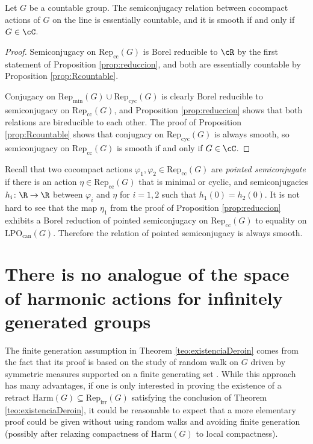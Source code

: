 \documentclass[reqno]{amsart}
\begin{document}
\begin{cor}
	Let $G$ be a countable group. The semiconjugacy relation between cocompact actions of $G$ on the line is essentially countable, and it is smooth if and only if $G \in \cC$.
\end{cor}
\begin{proof}
Semiconjugacy on $\mathrm{Rep}_\mathrm{cc}(G)$ is Borel reducible to $\cR$ by the first statement of Proposition \ref{prop:reduccion}, and both are essentially countable by Proposition \ref{prop:Rcountable}.

Conjugacy on $\mathrm{Rep}_\mathrm{min}(G) \cup \mathrm{Rep}_\mathrm{cyc}(G)$ is clearly Borel reducible to semiconjugacy on $\mathrm{Rep}_\mathrm{cc}(G)$, and Proposition \ref{prop:reduccion} shows that both relations are bireducible to each other. The proof of Proposition \ref{prop:Rcountable} shows that conjugacy on $\mathrm{Rep}_\mathrm{cyc}(G)$ is always smooth, so semiconjugacy on $\mathrm{Rep}_\mathrm{cc}(G)$ is smooth if and only if $G \in \cC$.
\end{proof}

\begin{rmk}
 Recall that two cocompact actions $\varphi_1, \varphi_2 \in \mathrm{Rep}_\mathrm{cc}(G)$ are \emph{pointed semiconjugate} if there is an action $\eta \in \mathrm{Rep}_\mathrm{cc}(G)$ that is minimal or cyclic, and semiconjugacies $h_i \colon \R \to \R$ between $\varphi_i$ and $\eta$ for $i = 1,2$ such that $h_1(0) = h_2(0)$. It is not hard to see that the map $\eta_1$ from the proof of Proposition \ref{prop:reduccion} exhibits a Borel reduction of pointed semiconjugacy on $\mathrm{Rep}_\mathrm{cc}(G)$ to equality on $\mathrm{LPO}_\mathrm{can}(G)$. Therefore the relation of pointed semiconjugacy is always smooth.
\end{rmk}
\appendix
\section{There is no analogue of the space of harmonic actions for infinitely generated groups} \label{subsection:deroinFinf}
The finite generation assumption in Theorem \ref{teo:existenciaDeroin} comes from the fact that its proof is based on the study of random walk on $G$ driven by symmetric  measures supported on a finite generating set \cite{DKNP}. While this approach has many advantages, if one is only interested in proving the existence of a retract $\mathrm{Harm}(G)\subseteq \mathrm{Rep}_\mathrm{irr}(G)$ satisfying the conclusion of Theorem \ref{teo:existenciaDeroin}, it could be reasonable to expect that a more elementary proof could be given without using random walks and avoiding finite generation (possibly after relaxing compactness of $\mathrm{Harm}(G)$ to local compactness). 
\end{document}
